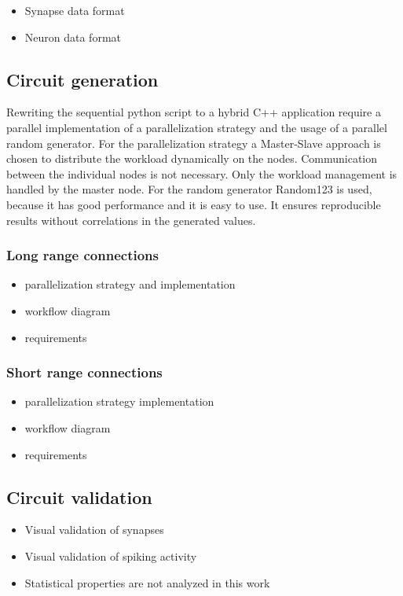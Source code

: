 \documentclass[a4paper]{article}
\begin{document}
\begin{itemize}
      \item Synapse data format
      \item Neuron data format
\end{itemize}

\subsection{Circuit generation}
Rewriting the sequential python script to a hybrid C++ application require a parallel implementation of a parallelization strategy and the usage of 
a parallel random generator. For the parallelization strategy a Master-Slave approach is chosen to distribute the workload dynamically on the nodes.
Communication between the individual nodes is not necessary. Only the workload management is handled by the master node.
For the random generator Random123 is used, because it has good performance and it is easy to use.
It ensures reproducible results without correlations in the generated values. 


\subsubsection{Long range connections}
\begin{itemize}
      \item parallelization strategy and implementation
      \item workflow diagram
      \item requirements 
\end{itemize}

\subsubsection{Short range connections}
\begin{itemize}
      \item parallelization strategy implementation
      \item workflow diagram
      \item requirements
\end{itemize}


\subsection{Circuit validation}
\begin{itemize}
      \item Visual validation of synapses
      \item Visual validation of spiking activity
      \item Statistical properties are not analyzed in this work 
\end{itemize}
\end{document}
